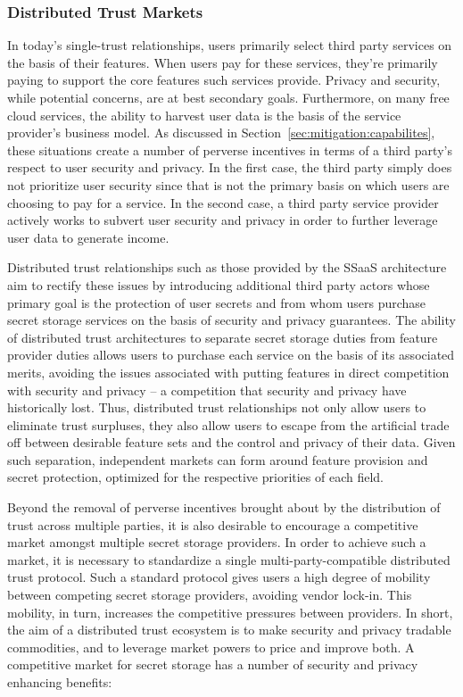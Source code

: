 \subsubsection{Distributed Trust Markets}

In today's single-trust relationships, users primarily select third
party services on the basis of their features. When users pay for
these services, they're primarily paying to support the core features
such services provide. Privacy and security, while potential concerns,
are at best secondary goals. Furthermore, on many free cloud services,
the ability to harvest user data is the basis of the service
provider's business model. As discussed in
Section~\ref{sec:mitigation:capabilites}, these situations create a
number of perverse incentives in terms of a third party's respect to
user security and privacy. In the first case, the third party simply
does not prioritize user security since that is not the primary basis
on which users are choosing to pay for a service. In the second case,
a third party service provider actively works to subvert user security
and privacy in order to further leverage user data to generate income.

Distributed trust relationships such as those provided by the SSaaS
architecture aim to rectify these issues by introducing additional
third party actors whose primary goal is the protection of user
secrets and from whom users purchase secret storage services on the
basis of security and privacy guarantees. The ability of distributed
trust architectures to separate secret storage duties from feature
provider duties allows users to purchase each service on the basis of
its associated merits, avoiding the issues associated with putting
features in direct competition with security and privacy -- a
competition that security and privacy have historically lost. Thus,
distributed trust relationships not only allow users to eliminate
trust surpluses, they also allow users to escape from the artificial
trade off between desirable feature sets and the control and privacy
of their data. Given such separation, independent markets can form
around feature provision and secret protection, optimized for the
respective priorities of each field.

Beyond the removal of perverse incentives brought about by the
distribution of trust across multiple parties, it is also desirable to
encourage a competitive market amongst multiple secret storage
providers. In order to achieve such a market, it is necessary to
standardize a single multi-party-compatible distributed trust
protocol. Such a standard protocol gives users a high degree of
mobility between competing secret storage providers, avoiding vendor
lock-in. This mobility, in turn, increases the competitive pressures
between providers. In short, the aim of a distributed trust ecosystem
is to make security and privacy tradable commodities, and to leverage
market powers to price and improve both. A competitive market for
secret storage has a number of security and privacy enhancing
benefits:

